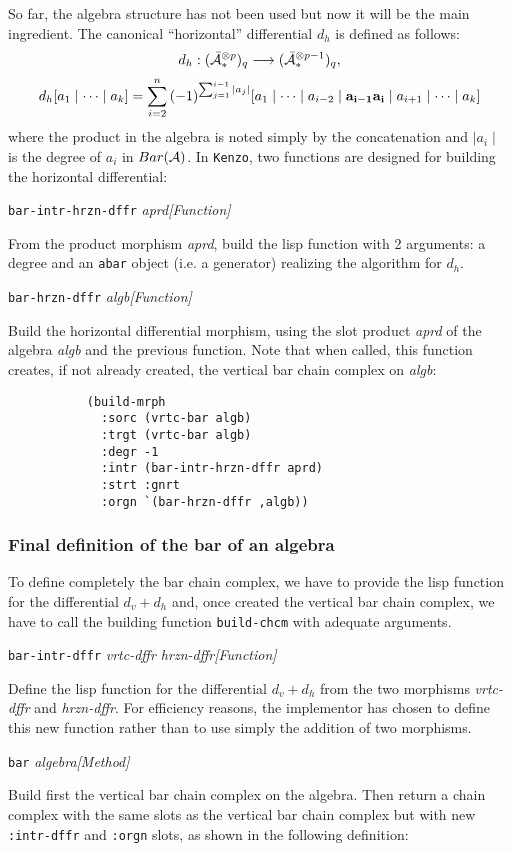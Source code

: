 So far, the algebra structure has not been used 
but now it will be the main ingredient.
The canonical ``horizontal''  differential $d_h$ is defined as follows:
$$d_h:({\bar{\cal A}}_*^{\otimes p})_q \longrightarrow ({\bar{\cal A}}_*^{\otimes {p-1}})_q,$$
$$d_h [a_1 \mid \cdots \mid a_k] = \sum_{i=2}^n{(-1)^{\sum_{j=1}^{i-1}{\mid a_j \mid}}}
      [a_1 \mid \cdots \mid a_{i-2} \mid {\bf a_{i-1}a_i} \mid a_{i+1} \mid \cdots \mid a_k]$$
where the product in the algebra is noted simply by the concatenation and $\mid a_i \mid$
is the degree of $a_i$ in $Bar({\cal A})$.
In {\tt Kenzo}, two functions are designed for building the horizontal differential:
\vskip 0.45cm
{\parindent=0mm
{\leftskip=5mm 
{\tt bar-intr-hrzn-dffr} {\em aprd}\hfill {\em [Function]} \par}
{\leftskip=15mm 
From the product morphism {\em aprd}, build the lisp function with 2 arguments:
a degree and an {\tt abar} object (i.e. a generator) realizing the algorithm for $d_h$. \par}
{\leftskip=5mm 
{\tt bar-hrzn-dffr} {\em algb}\hfill {\em [Function]} \par}
{\leftskip=15mm 
Build the horizontal differential morphism, using the slot pro\-duct {\em aprd} of
the algebra {\em algb} and the previous function. 
Note that when called, this function creates, if not already created,
the vertical bar chain complex on {\em algb}:
{\footnotesize\begin{verbatim}
           (build-mrph
             :sorc (vrtc-bar algb) 
             :trgt (vrtc-bar algb) 
             :degr -1
             :intr (bar-intr-hrzn-dffr aprd) 
             :strt :gnrt
             :orgn `(bar-hrzn-dffr ,algb))
\end{verbatim}}
\par}}


\subsubsection {Final definition of the bar of an algebra}

To define completely the bar chain complex, we have to provide the lisp function
for the differential $d_v + d_h$ and, once created the vertical bar chain complex,
we have to call the building function {\tt build-chcm} with adequate arguments.
\vskip 0.45cm
{\parindent=0mm
{\leftskip=5mm 
{\tt bar-intr-dffr} {\em vrtc-dffr hrzn-dffr}\hfill {\em [Function]} \par}
{\leftskip=15mm 
Define the lisp function for the differential $d_v+d_h$ from the two morphisms
{\em vrtc-dffr} and {\em hrzn-dffr}. For efficiency reasons, the implementor
has chosen to define this new function rather than to use simply
the addition of two morphisms.\par}
{\leftskip=5mm 
{\tt bar} {\em algebra}\hfill {\em [Method]} \par}
{\leftskip=15mm 
Build first the vertical bar chain complex on the algebra. Then return a chain complex
with the same slots as the vertical bar chain complex but with new {\tt :intr-dffr}
and {\tt :orgn} slots, as shown in the following definition: \par}
}

